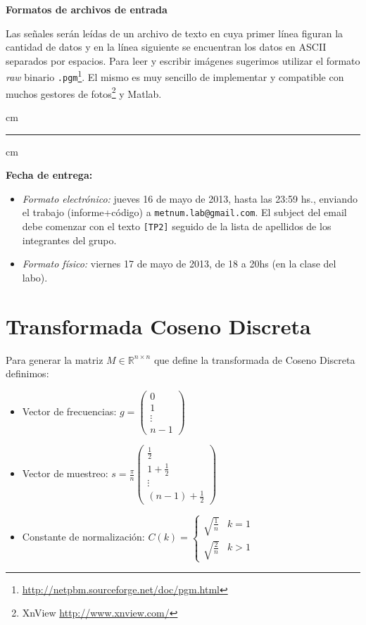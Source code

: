 \documentclass[10pt, a4paper]{article}
\newcommand{\real}{\mathbb{R}}
\begin{document}
\begin{itemize}
{\bf Formatos de archivos de entrada}

Las se\~nales ser\'an le\'idas de un archivo de texto en cuya primer l\'inea figuran la cantidad de datos y en la l\'inea siguiente se encuentran los datos en ASCII separados por espacios. Para leer y escribir im\'agenes sugerimos utilizar el formato {\em raw} binario \texttt{.pgm}\footnote{\url{http://netpbm.sourceforge.net/doc/pgm.html}}. 
El mismo es muy sencillo de implementar y compatible con muchos gestores de fotos\footnote{XnView \url{http://www.xnview.com/}} y Matlab.

 cm
\hrule
{} cm

{\bf Fecha de entrega:} 
\begin{itemize}
\item \textsl{Formato electr\'onico:} jueves 16 de mayo de 2013, hasta las 23:59 hs., enviando el trabajo (informe+c\'odigo) a \texttt{metnum.lab@gmail.com}. El subject del email debe comenzar con el texto \verb|[TP2]| seguido de la lista de apellidos de los integrantes del grupo. 
\item \textsl{Formato f\'isico:} viernes 17 de mayo de 2013, de 18 a 20hs (en la clase del labo).
\end{itemize}

\newpage
\appendix
\section{Transformada Coseno Discreta}\label{sec:dct}

Para generar la matriz $M\in\real^{n\times n}$ que define la transformada de Coseno Discreta definimos: 
\begin{itemize}
 \item Vector de frecuencias:  $g = \left(\begin{array}{c} 0 \\ 1 \\ \vdots \\ n-1 \end{array} \right)$
 \item Vector de muestreo: $ s= {\displaystyle \frac{\pi}{n} }\left(\begin{array}{c} \frac{1}{2} \\1+\frac{1}{2} \\  \vdots \\ (n-1)+\frac{1}{2} \end{array} \right) $
 \item Constante de normalizaci\'on: $C(k) = \left\{ \begin{array}{lr}\sqrt{\frac{1}{n}} & k=1 \\ \sqrt{\frac{2}{n}} & k > 1 \end{array} \right.$
\end{itemize}


\end{itemize}
\end{document}
